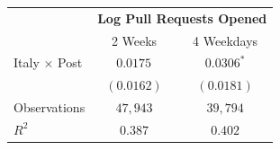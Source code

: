 \begin{tabular}{l|cc}
\hline \hline
 & \multicolumn{2}{c}{\textbf{Log Pull Requests Opened}} \\
 & 2 Weeks & 4 Weekdays \\
\hline
Italy $\times$ Post & $0.0175^{}$ & $0.0306^{*}$ \\
 & $(0.0162)$ & $(0.0181)$ \\
\hline
Observations & $47,943$ & $39,794$ \\
$R^2$ & $0.387$ & $0.402$ \\
\hline \hline
\end{tabular}
